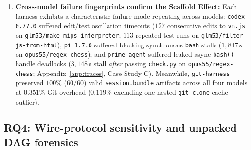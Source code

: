 \documentclass[11pt]{article}
\newcommand{\code}[1]{\nolinkurl{#1}}
\begin{document}
\begin{enumerate}[leftmargin=*,nosep]
  \item \textbf{Cross-model failure fingerprints confirm the Scaffold Effect:} Each harness exhibits a characteristic failure mode repeating across models: \texttt{codex 0.77.0} suffered edit/test oscillation timeouts ($127$ consecutive edits to \texttt{vm.js} on \code{glm53/make-mips-interpreter}; $113$ repeated test runs on \code{glm53/filter-js-from-html}); \texttt{pi 1.7.0} suffered blocking synchronous \texttt{bash} stalls ($1{,}847\,\mathrm{s}$ on \code{opus55/regex-chess}); and \texttt{prime-agent} suffered leaked async \texttt{bash()} handle deadlocks ($3{,}148\,\mathrm{s}$ stall \emph{after} passing \texttt{check.py} on \code{opus55/regex-chess}; Appendix~\ref{app:traces}, Case Study C). Meanwhile, \texttt{git-harness} preserved $100\%$ ($60/60$) valid \texttt{session.bundle} artifacts across all four models at $0.351\%$ Git overhead ($0.119\%$ excluding one nested \texttt{git clone} cache outlier).
\end{enumerate}

\subsection{RQ4: Wire-protocol sensitivity and unpacked DAG forensics}
\label{sec:rq4}
\end{document}
